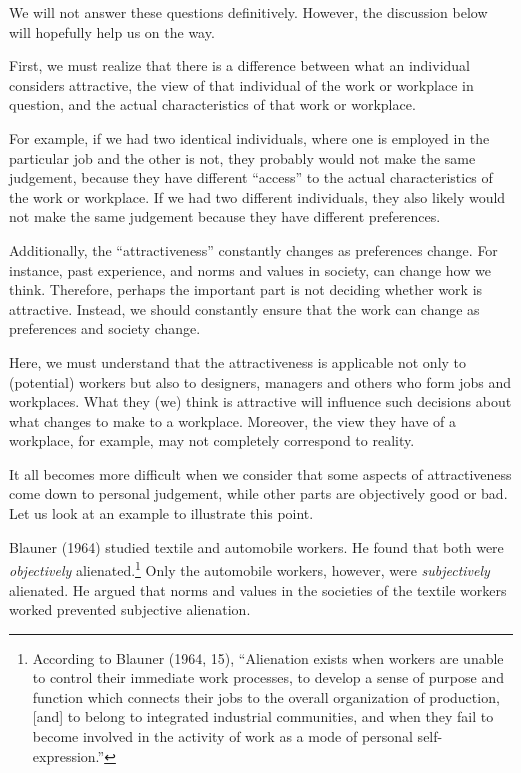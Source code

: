 \documentclass[
  12pt,
]{scrbook}
\begin{document}
We will not answer these questions definitively. However, the discussion below will hopefully help us on the way.

First, we must realize that there is a difference between what an individual considers attractive, the view of that individual of the work or workplace in question, and the actual characteristics of that work or workplace.

For example, if we had two identical individuals, where one is employed in the particular job and the other is not, they probably would not make the same judgement, because they have different ``access'' to the actual characteristics of the work or workplace. If we had two different individuals, they also likely would not make the same judgement because they have different preferences.

Additionally, the ``attractiveness'' constantly changes as preferences change. For instance, past experience, and norms and values in society, can change how we think. Therefore, perhaps the important part is not deciding whether work is attractive. Instead, we should constantly ensure that the work can change as preferences and society change.

Here, we must understand that the attractiveness is applicable not only to (potential) workers but also to designers, managers and others who form jobs and workplaces. What they (we) think is attractive will influence such decisions about what changes to make to a workplace. Moreover, the view they have of a workplace, for example, may not completely correspond to reality.

It all becomes more difficult when we consider that some aspects of attractiveness come down to personal judgement, while other parts are objectively good or bad. Let us look at an example to illustrate this point.

Blauner (1964) studied textile and automobile workers. He found that both were \emph{objectively} alienated.\footnote{According to Blauner (1964, 15), ``Alienation exists when workers are unable to control their immediate work processes, to develop a sense of purpose and function which connects their jobs to the overall organization of production, {[}and{]} to belong to integrated industrial communities, and when they fail to become involved in the activity of work as a mode of personal self-expression.''} Only the automobile workers, however, were \emph{subjectively} alienated. He argued that norms and values in the societies of the textile workers worked prevented subjective alienation.
\end{document}

